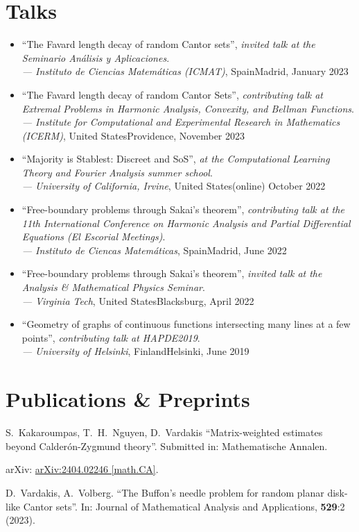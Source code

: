 \documentclass[12pt]{article}
\newcommand{\talk}[5]{\enquote{#1}, \emph{at the #2}.\\ \emph{--- #3}, #4\hfill {#5}}
\newcommand{\contalk}[5]{\enquote{#1}, \emph{contributing talk at #2}.\\ \emph{--- #3}, #4\hfill {#5}}
\newcommand{\invtalk}[5]{\enquote{#1}, \emph{invited talk at the #2}.\\ \emph{--- #3}, #4\hfill {#5}}
\begin{document}
\section*{Talks}

\begin{itemize}
	\item \invtalk{The Favard length decay of random Cantor sets}{Seminario An{\'a}lisis y Aplicaciones}{Instituto de Ciencias Matem{\'a}ticas (ICMAT)}{Spain}{Madrid, January 2023}
	\item \contalk{The Favard length decay of random Cantor Sets}{Extremal Problems in Harmonic Analysis, Convexity, and Bellman Functions}{Institute for Computational and Experimental Research in Mathematics (ICERM)}{United States}{Providence, November 2023}
	\item \talk{Majority is Stablest: Discreet and SoS}{Computational Learning Theory and Fourier Analysis summer school}{University of California, Irvine}{United States}{(online) October 2022}
	\item \contalk{Free-boundary problems through Sakai's theorem}{the 11th International Conference on Harmonic Analysis and Partial Differential Equations (El Escorial Meetings)}{Instituto de Ciencas Matem{\'a}ticas}{Spain}{Madrid, June 2022}
	\item \invtalk{Free-boundary problems through Sakai's theorem}{Analysis \& Mathematical Physics Seminar}{Virginia Tech}{United States}{Blacksburg, April 2022}
	\item \contalk{Geometry of graphs of continuous functions intersecting many lines at a few points}{HAPDE2019}{University of Helsinki}{Finland}{Helsinki, June 2019}
\end{itemize}


\section*{Publications \& Preprints}

S.~Kakaroumpas, T.~H.~Nguyen, D.~Vardakis
\enquote{Matrix-weighted estimates beyond Calder{\'o}n-Zygmund theory}.
Submitted in: Mathematische Annalen.

arXiv: \href{https://arxiv.org/abs/2404.02246}{arXiv:2404.02246 [math.CA]}.
\medskip


D.~Vardakis, A.~Volberg.
\enquote{The Buffon's needle problem for random planar disk-like Cantor sets}.
In: Journal of Mathematical Analysis and Applications, \textbf{529}:2 (2023).
\end{document}
